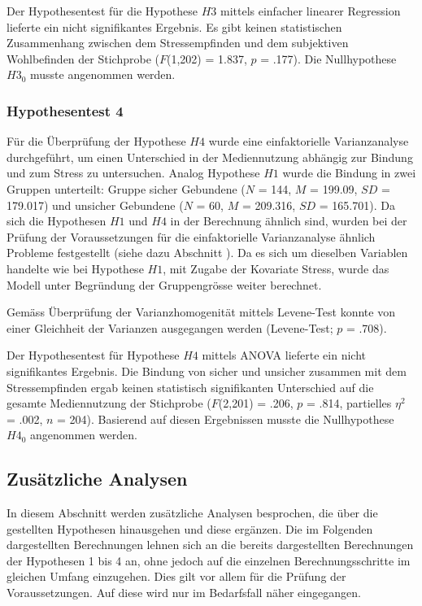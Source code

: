 Der Hypothesentest für die Hypothese $H3$ mittels einfacher linearer Regression lieferte ein nicht signifikantes Ergebnis. Es gibt keinen statistischen Zusammenhang zwischen dem Stressempfinden und dem subjektiven Wohlbefinden der Stichprobe ($F$(1,202) = 1.837, $p$ = .177).  Die Nullhypothese $H3_{0}$ musste angenommen werden.

\subsubsection{Hypothesentest 4}
Für die Überprüfung der Hypothese $H4$ wurde eine einfaktorielle Varianzanalyse durchgeführt, um einen Unterschied in der Mediennutzung abhängig zur Bindung und zum Stress zu untersuchen. Analog Hypothese $H1$ wurde die Bindung in zwei Gruppen unterteilt: Gruppe sicher Gebundene ($N$ = 144, $M$ = 199.09, $SD$ = 179.017) und unsicher Gebundene ($N$ = 60, $M$ = 209.316, $SD$ = 165.701). Da sich die Hypothesen $H1$ und $H4$ in der Berechnung ähnlich sind, wurden bei der Prüfung der Voraussetzungen für die einfaktorielle Varianzanalyse ähnlich Probleme festgestellt (siehe dazu Abschnitt ). Da es sich um dieselben Variablen handelte wie bei Hypothese $H1$, mit Zugabe der Kovariate Stress, wurde das Modell unter Begründung der Gruppengrösse weiter berechnet. 

Gemäss Überprüfung der Varianzhomogenität mittels Levene-Test konnte von einer Gleichheit der Varianzen ausgegangen werden (Levene-Test; $p$ = .708). 

Der Hypothesentest für Hypothese $H4$ mittels ANOVA lieferte ein nicht signifikantes Ergebnis. Die Bindung von sicher und unsicher zusammen mit dem Stressempfinden ergab keinen statistisch signifikanten Unterschied auf die gesamte Mediennutzung der Stichprobe ($F$(2,201) = .206, $p$ = .814, partielles $\eta^2$ = .002, $n$ = 204). Basierend auf diesen Ergebnissen musste die Nullhypothese $H4_{0}$ angenommen werden. 

\subsection{Zusätzliche Analysen} \label{sec:ZusätzlicheAnalysen}
In diesem Abschnitt werden zusätzliche Analysen besprochen, die über die gestellten Hypothesen hinausgehen und diese ergänzen. Die im Folgenden dargestellten Berechnungen lehnen sich an die bereits dargestellten Berechnungen der Hypothesen 1 bis 4 an, ohne jedoch auf die einzelnen Berechnungsschritte im gleichen Umfang einzugehen. Dies gilt vor allem für die Prüfung der Voraussetzungen. Auf diese wird nur im Bedarfsfall näher eingegangen.

